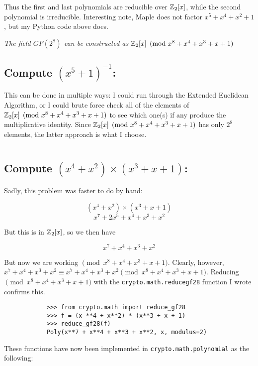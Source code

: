 \documentclass[12pt]{article}
\begin{document}
        Thus the first and last polynomials are reducible over $\mathbb{Z}_2[x]$, while the second polynomial is irreducible. Interesting note, Maple does not factor $x^5 + x^4 + x^2 + 1$, but my Python code above does.

    \textit{The field $GF(2^8)$ can be constructed as $\mathbb{Z}_2[x] \pmod{x^8 + x^4 + x^3 + x + 1}$}

    \subsection{Compute ${(x^5 + 1)}^{-1}$:}

        This can be done in multiple ways: I could run through the Extended Euclidean Algorithm, or I could brute force check all of the elements of $\mathbb{Z}_2[x] \pmod{x^8 + x^4 + x^3 + x + 1}$ to see which one(s) if any produce the multiplicative identity. Since $\mathbb{Z}_2[x] \pmod{x^8 + x^4 + x^3 + x + 1}$ has only $2^8$ elements, the latter approach is what I choose.

        \inputminted{python}{scripts/prob_2d.py}
    \subsection{Compute $(x^4 + x^2) \times (x^3 + x + 1)$:}

        Sadly, this problem was faster to do by hand:

        $$(x^4 + x^2) \times (x^3 + x + 1)$$
        $$x^7 + 2x^5 + x^4 + x^3 + x^2$$

        But this is in $\mathbb{Z}_2[x]$, so we then have

        $$x^7 + x^4 + x^3 + x^2$$

        But now we are working $\pmod{x^8 + x^4 + x^3 + x + 1}$. Clearly\texttrademark{}, however, $x^7 + x^4 + x^3 + x^2 \equiv x^7 + x^4 + x^3 + x^2 \pmod{x^8 + x^4 + x^3 + x + 1}$. Reducing $\pmod{x^8 + x^4 + x^3 + x + 1}$ with the \texttt{crypto.math.reduce\textunderscore{}gf28} function I wrote confirms this.

        \begin{verbatim}
            >>> from crypto.math import reduce_gf28
            >>> f = (x **4 + x**2) * (x**3 + x + 1)
            >>> reduce_gf28(f)
            Poly(x**7 + x**4 + x**3 + x**2, x, modulus=2)
        \end{verbatim}

    These functions have now been implemented in \texttt{crypto.math.polynomial} as the following:
\end{document}
